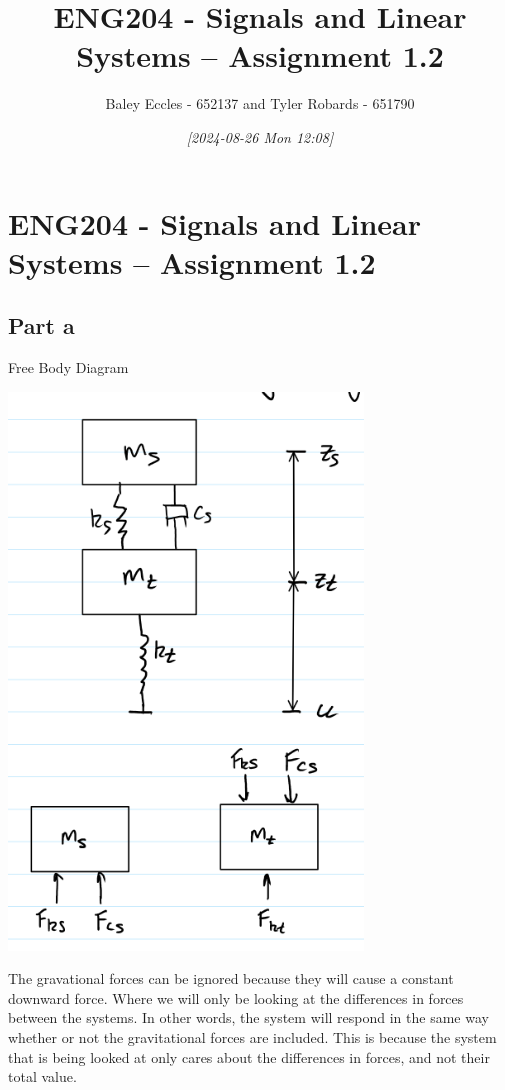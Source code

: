 \documentclass[11pt]{article}
\author{Baley Eccles - 652137 and Tyler Robards - 651790}
\date{\textit{{[}2024-08-26 Mon 12:08]}}
\title{ENG204 - Signals and Linear Systems – Assignment 1.2}
\begin{document}
\maketitle
\tableofcontents

\section{ENG204 - Signals and Linear Systems – Assignment 1.2}
\label{sec:org831f92d}
\subsection{Part a}
\label{sec:org72d9136}
Free Body Diagram
\begin{center}
\includegraphics[width=.9\linewidth]{ENG204-FBD.png}
\end{center}
The gravational forces can be ignored because they will cause a constant downward force. Where we will only be looking at the differences in forces between the systems. In other words, the system will respond in the same way whether or not the gravitational forces are included. This is because the system that is being looked at only cares about the differences in forces, and not their total value.
\end{document}
